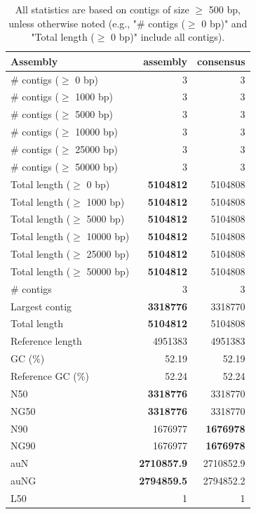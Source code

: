 \documentclass[12pt,a4paper]{article}
\begin{document}
\begin{table}[ht]
\begin{center}
\caption{All statistics are based on contigs of size $\geq$ 500 bp, unless otherwise noted (e.g., "\# contigs ($\geq$ 0 bp)" and "Total length ($\geq$ 0 bp)" include all contigs).}
\begin{tabular}{|l*{2}{|r}|}
\hline
Assembly & assembly & consensus \\ \hline
\# contigs ($\geq$ 0 bp) & 3 & 3 \\ \hline
\# contigs ($\geq$ 1000 bp) & 3 & 3 \\ \hline
\# contigs ($\geq$ 5000 bp) & 3 & 3 \\ \hline
\# contigs ($\geq$ 10000 bp) & 3 & 3 \\ \hline
\# contigs ($\geq$ 25000 bp) & 3 & 3 \\ \hline
\# contigs ($\geq$ 50000 bp) & 3 & 3 \\ \hline
Total length ($\geq$ 0 bp) & {\bf 5104812} & 5104808 \\ \hline
Total length ($\geq$ 1000 bp) & {\bf 5104812} & 5104808 \\ \hline
Total length ($\geq$ 5000 bp) & {\bf 5104812} & 5104808 \\ \hline
Total length ($\geq$ 10000 bp) & {\bf 5104812} & 5104808 \\ \hline
Total length ($\geq$ 25000 bp) & {\bf 5104812} & 5104808 \\ \hline
Total length ($\geq$ 50000 bp) & {\bf 5104812} & 5104808 \\ \hline
\# contigs & 3 & 3 \\ \hline
Largest contig & {\bf 3318776} & 3318770 \\ \hline
Total length & {\bf 5104812} & 5104808 \\ \hline
Reference length & 4951383 & 4951383 \\ \hline
GC (\%) & 52.19 & 52.19 \\ \hline
Reference GC (\%) & 52.24 & 52.24 \\ \hline
N50 & {\bf 3318776} & 3318770 \\ \hline
NG50 & {\bf 3318776} & 3318770 \\ \hline
N90 & 1676977 & {\bf 1676978} \\ \hline
NG90 & 1676977 & {\bf 1676978} \\ \hline
auN & {\bf 2710857.9} & 2710852.9 \\ \hline
auNG & {\bf 2794859.5} & 2794852.2 \\ \hline
L50 & 1 & 1 \\ \hline

\end{tabular}
\end{center}
\end{table}
\end{document}
